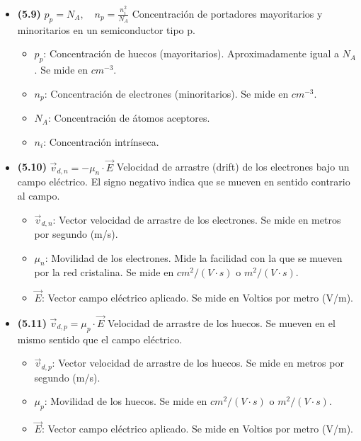 \documentclass{article}
\begin{document}
\begin{itemize}
				\item \textbf{(5.9)} $\boxed{p_p = N_A, \quad n_p = \frac{n_i^2}{N_A}}$ Concentración de portadores mayoritarios y minoritarios en un semiconductor tipo p.
					\begin{itemize}
						\item $p_p$: Concentración de huecos (mayoritarios). Aproximadamente igual a $N_A$. Se mide en $cm^{-3}$.
						\item $n_p$: Concentración de electrones (minoritarios). Se mide en $cm^{-3}$.
						\item $N_A$: Concentración de átomos aceptores.
						\item $n_i$: Concentración intrínseca.
					\end{itemize}

				\item \textbf{(5.10)} $\boxed{\vec{v}_{d,n} = -\mu_n \cdot \vec{E}}$ Velocidad de arrastre (drift) de los electrones bajo un campo eléctrico. El signo negativo indica que se mueven en sentido contrario al campo.
					\begin{itemize}
						\item $\vec{v}_{d,n}$: Vector velocidad de arrastre de los electrones. Se mide en metros por segundo (m/s).
						\item $\mu_n$: Movilidad de los electrones. Mide la facilidad con la que se mueven por la red cristalina. Se mide en $cm^2/(V\cdot s)$ o $m^2/(V\cdot s)$.
						\item $\vec{E}$: Vector campo eléctrico aplicado. Se mide en Voltios por metro (V/m).
					\end{itemize}

				\item \textbf{(5.11)} $\boxed{\vec{v}_{d,p} = \mu_p \cdot \vec{E}}$ Velocidad de arrastre de los huecos. Se mueven en el mismo sentido que el campo eléctrico.
					\begin{itemize}
						\item $\vec{v}_{d,p}$: Vector velocidad de arrastre de los huecos. Se mide en metros por segundo (m/s).
						\item $\mu_p$: Movilidad de los huecos. Se mide en $cm^2/(V\cdot s)$ o $m^2/(V\cdot s)$.
						\item $\vec{E}$: Vector campo eléctrico aplicado. Se mide en Voltios por metro (V/m).
					\end{itemize}


\end{itemize}
\end{document}
